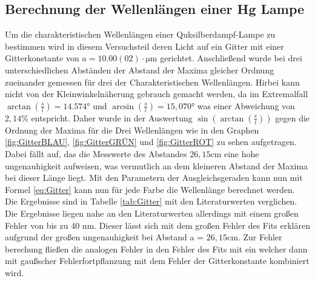 \documentclass[11pt, a4paper]{article}
\begin{document}
    \subsection{Berechnung der Wellenlängen einer Hg Lampe}
    Um die charakteristischen Wellenlängen einer Quksilberdampf-Lampe zu bestimmen wird in diesem Versuchsteil deren Licht auf ein Gitter mit einer Gitterkonstante von $a=10.00(02)\cdot \si{\micro\metre}$ gerichtet.
    Anschließend wurde bei drei unterschiedlichen Abständen der Abstand der Maxima gleicher Ordnung zueinander gemessen für drei der Charakteristischen Wellenlängen. Hirbei kann nicht von der Kleinwinkelnäherung gebrauch gemacht werden, da im Extremalfall $\arctan(\frac{s}{l}) = 14.574°$ und $\arcsin(\frac{s}{l}) = 15,070°$
    was einer Abweichung von $2,14\%$ entspricht. Daher wurde in der Auswertung $\sin(\arctan(\frac{s}{l}))$ gegen die Ordnung der Maxima für die Drei Wellenlängen wie in den Graphen \ref{fig:GitterBLAU}, \ref{fig:GitterGRÜN} und \ref{fig:GitterROT} zu sehen aufgetragen.
    Dabei fällt auf, das die Messwerte des Abstandes $26,15 \si{\centi\metre}$ eine hohe ungenauhigkeit aufweisen, was vermutlich an dem kleineren Abstand der Maxima bei dieser Länge liegt.
    Mit den Parametern der Ausgleichsgeraden kann nun mit Formel \ref{eq:Gitter} kann nun für jede Farbe die Wellenlänge berechnet werden. Die Ergebnisse sind in Tabelle \ref{tab:Gitter} mit den Literaturwerten verglichen. Die Ergebnisse liegen nahe an den Literaturwerten allerdings mit einem großen Fehler von bis zu 40 nm.
    Dieser lässt sich mit dem großen Fehler des Fits erklären aufgrund der großen ungenauhigkeit bei Abstand a =  $26,15 \si{\centi\metre}$. Zur Fehler berechung fließen die analogen Fehler in den Fehler des Fits mit ein welcher dann mit gaußscher Fehlerfortpflanzung mit dem Fehler der Gitterkonstante kombiniert wird.
\end{document}
